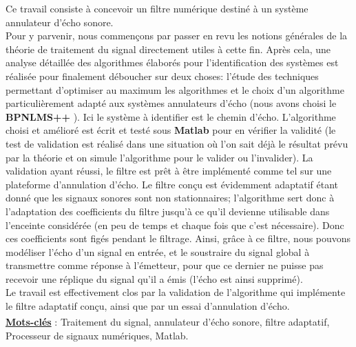 Ce travail consiste à concevoir un filtre numérique destiné à un système annulateur d'écho sonore.\\
Pour y parvenir, nous commençons par passer en revu les notions générales de la théorie de traitement du signal directement utiles à cette fin. Après cela, une analyse détaillée des algorithmes élaborés pour l'identification des systèmes est réalisée pour finalement déboucher sur deux choses: l'étude des techniques permettant d'optimiser au maximum les algorithmes et le choix d'un al\-go\-ri\-th\-me particulièrement adapté aux systèmes annulateurs d'écho (nous avons choisi le \textbf{BPNLMS++} ). Ici le système à identifier est le chemin d'écho. L'algorithme choisi et amélioré est écrit et testé sous \textbf{Matlab} pour en vérifier la validité (le test de validation est réalisé dans une situation où l'on sait déjà le résultat prévu par la théorie et on simule l'algorithme pour le valider ou l'invalider). La validation ayant réussi, le filtre est prêt à être implémenté comme tel sur une plateforme d'annulation d'écho. Le filtre conçu est évidemment adaptatif étant donné que les signaux sonores sont non stationnaires; l'algorithme sert donc à l'adaptation des coefficients du filtre jusqu'à ce qu'il devienne utilisable dans l'enceinte considérée (en peu de temps et chaque fois que c'est nécessaire). Donc ces coefficients sont figés pendant le filtrage. Ainsi, grâce à ce filtre, nous pouvons modéliser l'écho d'un signal en entrée, et le soustraire du signal global à transmettre comme réponse à l'émetteur, pour que ce dernier ne puisse pas recevoir une réplique du signal qu'il a émis (l'écho est ainsi supprimé).\\
Le travail est effectivement clos par la validation de l'algorithme qui implémente le filtre adaptatif conçu, ainsi que par un essai d'annulation d'écho.\\
$ _{ } $\\
\textbf{\underline{Mots-clés}} : Traitement du signal, annulateur d'écho sonore, filtre adaptatif, Processeur de signaux numériques, Matlab.